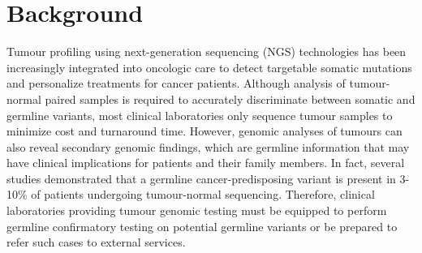 \documentclass{bmcart}
\begin{document}
\begin{frontmatter}
\begin{abstractbox}
\begin{keyword}
\end{keyword}


\end{abstractbox}
%

\end{frontmatter}



\section*{Background}

Tumour profiling using next-generation sequencing (NGS) technologies has been increasingly integrated into oncologic care to detect targetable somatic mutations and personalize treatments for cancer patients. Although analysis of tumour-normal paired samples is required to accurately discriminate between somatic and germline variants, most clinical laboratories only sequence tumour samples to minimize cost and turnaround time. However, genomic analyses of tumours can also reveal secondary genomic findings, which are germline information that may have clinical implications for patients and their family members. In fact, several studies demonstrated that a germline cancer-predisposing variant is present in 3-10\% of patients undergoing tumour-normal sequencing. Therefore, clinical laboratories providing tumour genomic testing must be equipped to perform germline confirmatory testing on potential germline variants or be prepared to refer such cases to external services.
\end{document}
